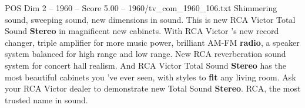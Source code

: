 \begin{textsample}{POS Dim 2 – 1960 – Score 5.00 – 1960/tv\_com\_1960\_106.txt}  \label{ex:f2_pos_022}
Shimmering sound, sweeping sound, new dimensions in sound.
This is new RCA Victor Total Sound \textbf{Stereo} in magnificent new cabinets.
With RCA Victor 's new record changer, triple amplifier for more music power, brilliant AM-FM \textbf{radio}, a speaker system balanced for high range and low range.
New RCA reverberation sound system for concert hall realism.
And RCA Victor Total Sound \textbf{Stereo} has the most beautiful cabinets you 've ever seen, with styles to \textbf{fit} any living room.
Ask your RCA Victor dealer to demonstrate new Total Sound \textbf{Stereo}.
RCA, the most trusted name in sound.

\end{textsample}
